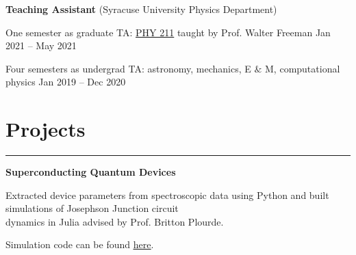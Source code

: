 \documentclass[9pt]{extarticle}
\newcommand{\myline}{\rule[\baselineskip]{\linewidth}{1pt}}
\begin{document}
\vspace{7pt}
\large\textbf{Teaching Assistant} \normalsize (Syracuse University Physics Department)

\begin{compactitem}
\normalsize
\item One semester as graduate TA: \href{https://walterfreeman.github.io/phy211/}{PHY 211} taught by Prof. Walter Freeman \hfill \small Jan 2021 -- May 2021 \normalsize
\item Four semesters as undergrad TA: astronomy, mechanics, E $\&$ M, computational physics  \hfill \small Jan 2019 -- Dec 2020 \normalsize
\end{compactitem}




\section{Projects}

\myline




\vspace{2.5pt}
\large\textbf{Superconducting Quantum Devices}
\normalsize
\begin{compactitem}

\item Extracted device parameters from spectroscopic data using Python and built simulations of Josephson Junction circuit \\ dynamics in Julia advised by Prof. Britton Plourde. 

\item Simulation code can be found \href{https://github.com/aarontrowbridge/cQED}{\underline{here}}.

\end{compactitem}
\end{document}
